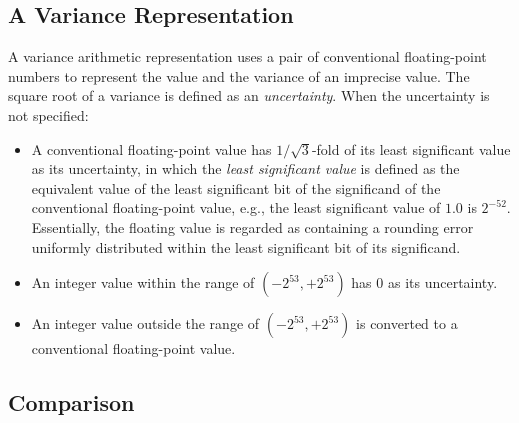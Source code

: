 \documentclass[twoside]{article}
\numberwithin{equation}{section}
\begin{document}
\subsection{A Variance Representation}

A variance arithmetic representation uses a pair of conventional floating-point numbers to represent the value and the variance of an imprecise value.
The square root of a variance is defined as an \emph{uncertainty}.  
When the uncertainty is not specified:
\begin{itemize}
\item A conventional floating-point value has $1/\sqrt{3}$-fold of its least significant value as its uncertainty, in which the \emph{least significant value} is defined as the equivalent value of the least significant bit of the significand of the conventional floating-point value, e.g., the least significant value of $1.0$ is $2^{-52}$.
Essentially, the floating value is regarded as containing a rounding error uniformly distributed within the least significant bit of its significand.

\item An integer value within the range of $(-2^{53}, +2^{53})$ has 0 as its uncertainty.

\item An integer value outside the range of $(-2^{53}, +2^{53})$ is converted to a conventional floating-point value.
\end{itemize}


\subsection{Comparison}

\iffalse
\end{document}
